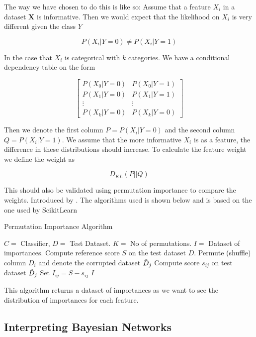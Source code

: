 The way we have chosen to do this is like so: Assume that a feature $X_i$ in a dataset $\boldsymbol{X}$ is informative. Then we would expect that the likelihood on $X_i$ is very different given the class $Y$

\begin{equation*}
    P(X_i | Y = 0) \neq P(X_i | Y = 1)
\end{equation*}

In the case that $X_i$ is categorical with $k$ categories. We have a conditional dependency table on the form

\begin{equation*}
    \begin{bmatrix}
        P(X_0 | Y = 0) & P(X_0 | Y = 1) \\ 
        P(X_1 | Y = 0) & P(X_1 | Y = 1) \\
        \vdots & \vdots \\
        P(X_k | Y = 0) & P(X_k | Y = 0)
    \end{bmatrix}
\end{equation*}

Then we denote the first column $P = P(X_i | Y = 0)$ and the second column $Q = P(X_i | Y = 1)$. We assume that the more informative $X_i$ is as a feature, the difference in these distributions should increase. To calculate the feature weight we define the weight as 

\begin{equation*}
    D_{KL}(P||Q)
\end{equation*}

This should also be validated using permutation importance to compare the weights. Introduced by \citet[p.23-25]{Breiman:2021:MachLearn}. The algorithms used is shown below and is based on the one used by ScikitLearn \cite{Pedregosa:2011:JMLR}

\begin{algorithm}
    \caption{Permutation Importance Algorithm}
    \begin{algorithmic}
        \REQUIRE $C = $ Classifier, $D = $ Test Dataset. $K = $ No of permutations.
        \ENSURE $I = $ Dataset of importances.
        \STATE Compute reference score $S$ on the test dataset $D$.
                \STATE Permute (shuffle) column $D_{i}$ and denote the corrupted dataset $\Tilde{D}_{j}$
                \STATE Compute score $s_{ij}$ on test dataset $\Tilde{D}_{j}$
                \STATE Set $I_{ij} = S - s_{ij}$
            \ENDFOR
        \ENDFOR
        \RETURN $I$ 
    \end{algorithmic}
\end{algorithm}

This algorithm returns a dataset of importances as we want to see the distribution of importances for each feature.

\subsection{Interpreting Bayesian Networks}

